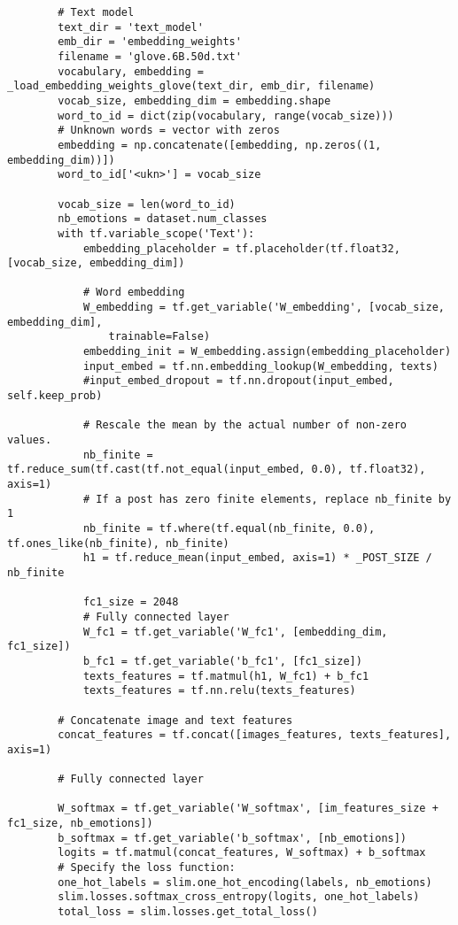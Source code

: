\begin{lstlisting}
        # Text model
        text_dir = 'text_model'
        emb_dir = 'embedding_weights'
        filename = 'glove.6B.50d.txt'
        vocabulary, embedding = _load_embedding_weights_glove(text_dir, emb_dir, filename)
        vocab_size, embedding_dim = embedding.shape
        word_to_id = dict(zip(vocabulary, range(vocab_size)))
        # Unknown words = vector with zeros
        embedding = np.concatenate([embedding, np.zeros((1, embedding_dim))])
        word_to_id['<ukn>'] = vocab_size

        vocab_size = len(word_to_id)
        nb_emotions = dataset.num_classes
        with tf.variable_scope('Text'):
            embedding_placeholder = tf.placeholder(tf.float32, [vocab_size, embedding_dim])
        
            # Word embedding
            W_embedding = tf.get_variable('W_embedding', [vocab_size, embedding_dim], 
                trainable=False)
            embedding_init = W_embedding.assign(embedding_placeholder)
            input_embed = tf.nn.embedding_lookup(W_embedding, texts)
            #input_embed_dropout = tf.nn.dropout(input_embed, self.keep_prob)

            # Rescale the mean by the actual number of non-zero values.
            nb_finite = tf.reduce_sum(tf.cast(tf.not_equal(input_embed, 0.0), tf.float32), axis=1)
            # If a post has zero finite elements, replace nb_finite by 1
            nb_finite = tf.where(tf.equal(nb_finite, 0.0), tf.ones_like(nb_finite), nb_finite)
            h1 = tf.reduce_mean(input_embed, axis=1) * _POST_SIZE / nb_finite

            fc1_size = 2048
            # Fully connected layer
            W_fc1 = tf.get_variable('W_fc1', [embedding_dim, fc1_size])
            b_fc1 = tf.get_variable('b_fc1', [fc1_size])
            texts_features = tf.matmul(h1, W_fc1) + b_fc1
            texts_features = tf.nn.relu(texts_features)

        # Concatenate image and text features
        concat_features = tf.concat([images_features, texts_features], axis=1)

        # Fully connected layer

        W_softmax = tf.get_variable('W_softmax', [im_features_size + fc1_size, nb_emotions])
        b_softmax = tf.get_variable('b_softmax', [nb_emotions])
        logits = tf.matmul(concat_features, W_softmax) + b_softmax
        # Specify the loss function:
        one_hot_labels = slim.one_hot_encoding(labels, nb_emotions)
        slim.losses.softmax_cross_entropy(logits, one_hot_labels)
        total_loss = slim.losses.get_total_loss()


\end{lstlisting}
